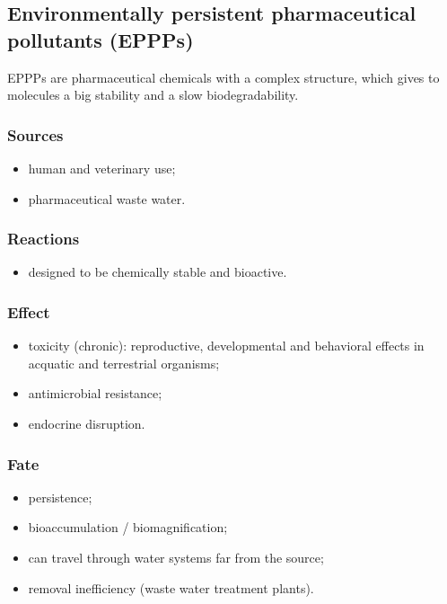 \documentclass{article}
\begin{document}
\newpage
\subsection{Environmentally persistent pharmaceutical pollutants (EPPPs)}
EPPPs are pharmaceutical chemicals with a complex structure, which gives to
molecules a big stability and a slow biodegradability.

\subsubsection{Sources}
\begin{itemize}
    \item human and veterinary use;
    \item pharmaceutical waste water.
\end{itemize}

\subsubsection{Reactions}
\begin{itemize}
    \item designed to be chemically stable and bioactive.
\end{itemize}

\subsubsection{Effect}
\begin{itemize}
    \item toxicity (chronic): reproductive, developmental and behavioral effects in acquatic and terrestrial organisms;
    \item antimicrobial resistance;
    \item endocrine disruption.
\end{itemize}

\subsubsection{Fate}
\begin{itemize}
    \item persistence;
    \item bioaccumulation / biomagnification;
    \item can travel through water systems far from the source;
    \item removal inefficiency (waste water treatment plants).
\end{itemize}
\end{document}
